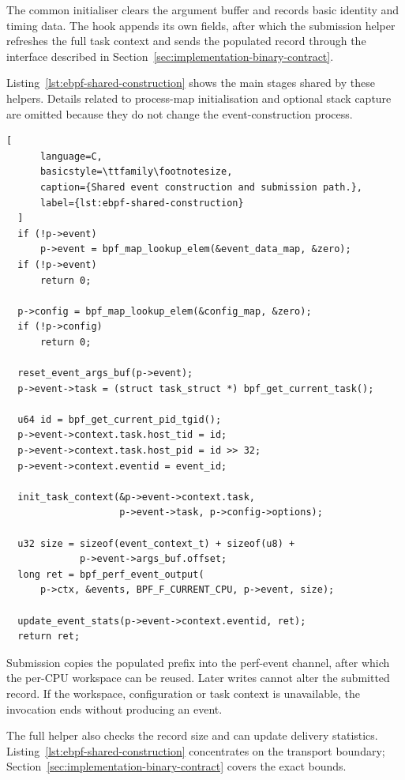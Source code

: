 The common initialiser clears the argument buffer and records basic identity
and timing data. The hook appends its own fields, after which the submission
helper refreshes the full task context and sends the populated record through
the interface described in Section~\ref{sec:implementation-binary-contract}.

Listing~\ref{lst:ebpf-shared-construction} shows the main stages shared by these
helpers. Details related to process-map initialisation and optional stack
capture are omitted because they do not change the event-construction process.

\begin{lstlisting}[
      language=C,
      basicstyle=\ttfamily\footnotesize,
      caption={Shared event construction and submission path.},
      label={lst:ebpf-shared-construction}
  ]
  if (!p->event)
      p->event = bpf_map_lookup_elem(&event_data_map, &zero);
  if (!p->event)
      return 0;

  p->config = bpf_map_lookup_elem(&config_map, &zero);
  if (!p->config)
      return 0;

  reset_event_args_buf(p->event);
  p->event->task = (struct task_struct *) bpf_get_current_task();

  u64 id = bpf_get_current_pid_tgid();
  p->event->context.task.host_tid = id;
  p->event->context.task.host_pid = id >> 32;
  p->event->context.eventid = event_id;

  init_task_context(&p->event->context.task,
                    p->event->task, p->config->options);

  u32 size = sizeof(event_context_t) + sizeof(u8) +
             p->event->args_buf.offset;
  long ret = bpf_perf_event_output(
      p->ctx, &events, BPF_F_CURRENT_CPU, p->event, size);

  update_event_stats(p->event->context.eventid, ret);
  return ret;
  \end{lstlisting}

Submission copies the populated prefix into the perf-event channel, after which
the per-CPU workspace can be reused. Later writes cannot alter the submitted
record. If the workspace, configuration or task context is unavailable, the
invocation ends without producing an event.

The full helper also checks the record size and can update delivery statistics.
Listing~\ref{lst:ebpf-shared-construction} concentrates on the transport
boundary; Section~\ref{sec:implementation-binary-contract} covers the exact
bounds.

